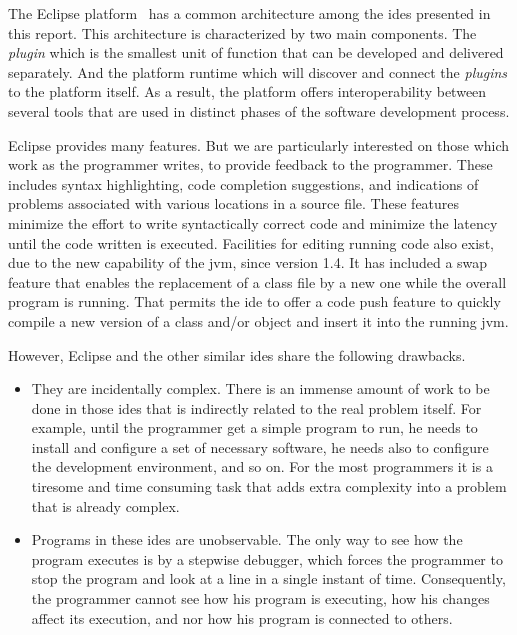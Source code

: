The Eclipse platform~\cite{DesRivieres2004} has a common architecture among the \ac{ide}s presented in this report. This architecture is characterized by two main components. The \textit{plugin} which is the smallest unit of function that can be developed and delivered separately. And the platform runtime which will discover and connect the \textit{plugins} to the platform itself. As a result, the platform offers interoperability between several tools that are used in distinct phases of the software development process.

Eclipse provides many features. But we are particularly interested on those which work as the programmer writes, to provide feedback to the programmer. These includes syntax highlighting, code completion suggestions, and indications of problems associated with various locations in a source file. These features minimize the effort to write syntactically correct code and minimize the latency until the code written is executed. Facilities for editing running code also exist, due to the new capability of the \ac{jvm}, since version 1.4. It has included a swap feature that enables the replacement of a class file by a new one while the overall program is running. That permits the \ac{ide} to offer a code push feature to quickly compile a new version of a class and/or object and insert it into the running \ac{jvm}.

However, Eclipse and the other similar \ac{ide}s share the following drawbacks.
\begin{itemize}
	\item They are incidentally complex. There is an immense amount of work to be done in those \ac{ide}s that is indirectly related to the real problem itself. For example, until the programmer get a simple program to run, he needs to install and configure a set of necessary software, he needs also to configure the development environment, and so on. For the most programmers it is a tiresome and time consuming task that adds extra complexity into a problem that is already complex.
	\item Programs in these \ac{ide}s are unobservable. The only way to see how the program executes is by a stepwise debugger, which forces the programmer to stop the program and look at a line in a single instant of time. Consequently, the programmer cannot see how his program is executing, how his changes affect its execution, and nor how his program is connected to others.
\end{itemize}
